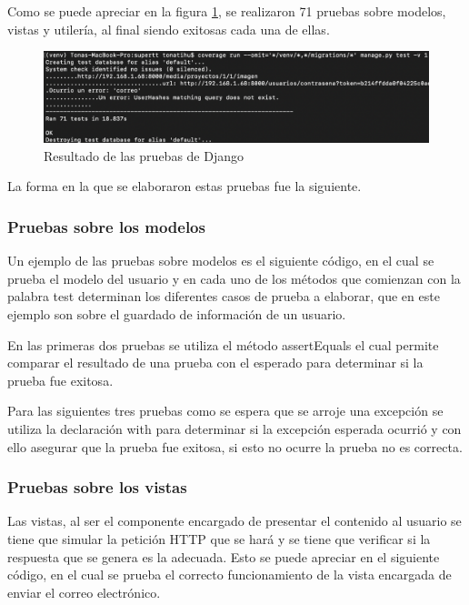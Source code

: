Como se puede apreciar en la figura \ref{fig:pruebasDjango}, se realizaron 71 pruebas sobre modelos, vistas y utilería, al final siendo exitosas cada una de ellas.

\begin{figure}[H]
	\centering
	\includegraphics[width=450px]{capitulo6/unitarias/img/pruebasDjango.png}
	\caption{Resultado de las pruebas de Django}
	\label{fig:pruebasDjango}
\end{figure}

La forma en la que se elaboraron estas pruebas fue la siguiente.

\subsubsection{Pruebas sobre los modelos}

Un ejemplo de las pruebas sobre modelos es el siguiente código, en el cual se prueba el modelo del usuario y en cada uno de los métodos que comienzan con la palabra test determinan los diferentes casos de prueba a elaborar, que en este ejemplo son sobre el guardado de información de un usuario.



En las primeras dos pruebas se utiliza el método assertEquals el cual permite comparar el resultado de una prueba con el esperado para determinar si la prueba fue exitosa.

Para las siguientes tres pruebas como se espera que se arroje una excepción se utiliza la declaración with para determinar si la excepción esperada ocurrió y con ello asegurar que la prueba fue exitosa, si esto no ocurre la prueba no es correcta. 

\subsubsection{Pruebas sobre los vistas}

Las vistas, al ser el componente encargado de presentar el contenido al usuario se tiene que simular la petición HTTP que se hará y se tiene que verificar si la respuesta que se genera es la adecuada. Esto se puede apreciar en el siguiente código, en el cual se prueba el correcto funcionamiento de la vista encargada de enviar el correo electrónico.

